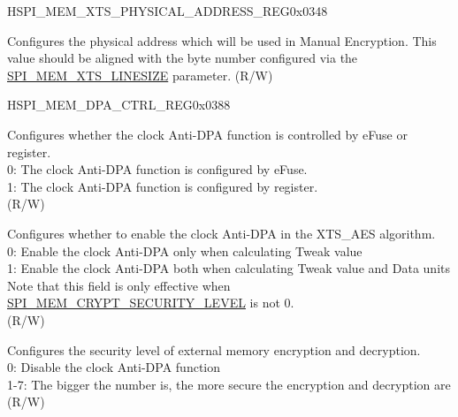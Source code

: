 \begin{register}{H}{SPI\_MEM\_XTS\_PHYSICAL\_ADDRESS\_REG}{0x0348}\label{regdesc:SPIMEMXTSPHYSICALADDRESSREG}
%
%
\regnewline%
\begin{regdesc}\begin{reglist}
\label{fielddesc:SPIMEMXTSPHYSICALADDRESS}\item [SPI\_MEM\_XTS\_PHYSICAL\_ADDRESS] Configures the physical address which will be used in Manual Encryption. This value should be aligned with the byte number configured via the \hyperref[fielddesc:SPIMEMXTSLINESIZE]{SPI\_MEM\_XTS\_LINESIZE} parameter. (R/W)
\end{reglist}\end{regdesc}
\end{register}


\begin{register}{H}{SPI\_MEM\_DPA\_CTRL\_REG}{0x0388}\label{regdesc:SPIMEMDPACTRLREG}
%
%
%
%
\regnewline%
\begin{regdesc}\begin{reglist}
\label{fielddesc:SPIMEMCRYPTDPASELECTREGISTER}\item [SPI\_MEM\_CRYPT\_DPA\_SELECT\_REGISTER] Configures whether the clock Anti-DPA function is controlled by eFuse or register. \\
0: The clock Anti-DPA function is configured by eFuse.\\
1: The clock Anti-DPA function is configured by register.\\
(R/W)
\label{fielddesc:SPIMEMCRYPTCALCDDPAEN}\item [SPI\_MEM\_CRYPT\_CALC\_D\_DPA\_EN] Configures whether to enable the clock Anti-DPA in the XTS\_AES algorithm. \\
0: Enable the clock Anti-DPA only when calculating Tweak value\\
1: Enable the clock Anti-DPA both when calculating Tweak value and Data units\\
Note that this field is only effective when \hyperref[fielddesc:SPIMEMCRYPTSECURITYLEVEL]{SPI\_MEM\_CRYPT\_SECURITY\_LEVEL} is not 0.\\
(R/W)

\label{fielddesc:SPIMEMCRYPTSECURITYLEVEL}\item [SPI\_MEM\_CRYPT\_SECURITY\_LEVEL] Configures the security level of external memory encryption and decryption. \\
0: Disable the clock Anti-DPA function\\
1-7: The bigger the number is, the more secure the encryption and decryption are\\
(R/W)
\end{reglist}\end{regdesc}
\end{register}


